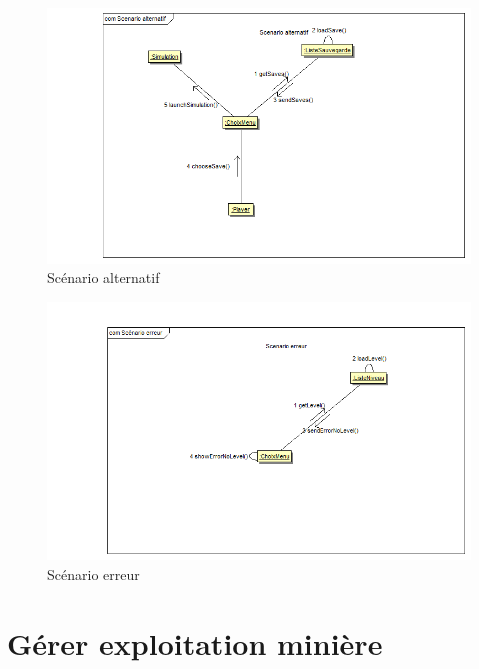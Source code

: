 \documentclass[a4paper]{report}
\begin{document}
\begin{figure}[htp]%
\includegraphics[width=\columnwidth]{img/spec/alternatif}%
\caption{Scénario alternatif}%
\label{}%
\end{figure}

\begin{figure}[htp]%
\includegraphics[width=\columnwidth]{img/spec/erreur}%
\caption{Scénario erreur}%
\label{}%
\end{figure}

\section*{Gérer exploitation minière}
\end{document}
